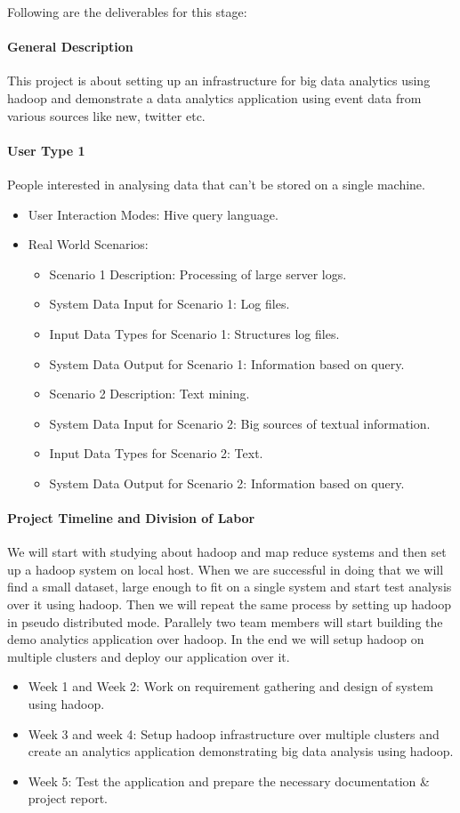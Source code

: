 Following are the deliverables for this stage:

\paragraph{General Description}
This project is about setting up an infrastructure for big data analytics using hadoop and demonstrate a data analytics application using event data from various sources like new, twitter etc.

\paragraph{User Type 1}
People interested in analysing data that can't be stored on a single machine.
\begin{itemize}
\item User Interaction Modes: Hive query language.
\item Real World Scenarios:
  \begin{itemize}
  \item Scenario 1 Description: Processing of large server logs.
  \item System Data Input for Scenario 1: Log files.
  \item Input Data Types for Scenario 1: Structures log files.
  \item System Data Output for Scenario 1: Information based on query.
  \item Scenario 2 Description: Text mining.
  \item System Data Input for Scenario 2: Big sources of textual information.
  \item Input Data Types for Scenario 2: Text.
  \item System Data Output for Scenario 2: Information based on query.
  \end{itemize}
\end{itemize}

\paragraph{Project Timeline and Division of Labor}
We will start with studying about hadoop and map reduce systems and then  set up a hadoop system on local host. When we are successful in doing that we will find a small dataset, large enough to fit on a single system and start test analysis over it using hadoop. Then we will repeat the same process by setting up hadoop in pseudo distributed mode. Parallely two team members will start building the demo analytics application over hadoop. In the end we will setup hadoop on multiple clusters and deploy our application over it.
\begin{itemize}
	\item Week 1 and Week 2: Work on requirement gathering and design of system using hadoop.
	\item Week 3 and week 4: Setup hadoop infrastructure over multiple clusters and create an analytics application demonstrating big data analysis using hadoop.
	\item Week 5: Test the application and prepare the necessary documentation & project report.
\end{itemize}